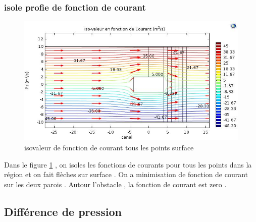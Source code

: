 \documentclass[a4paper,11pt]{report} %
\begin{document}
\subsubsection{isole profie de fonction de courant}
\begin{figure}[!h]
\centering
\hspace*{0mm}\vfill
\begin{center} \includegraphics[width=1.\textwidth]{iso_psi_surface.jpg} \end{center}
\vfill\hspace*{0mm}
\caption{isovaleur de fonction de courant tous les points surface }
\label{phi_surface_iso}
\end{figure}\pagebreak
Dans le figure \ref{phi_surface_iso} , on isoles les fonctions de courants pour tous les points dans la région et on fait flèches sur surface . On a minimisation de fonction de courant sur les deux parois .  Autour l'obstacle ,  la fonction de courant est zero  . 




\subsection{Différence de pression}
\end{document}
